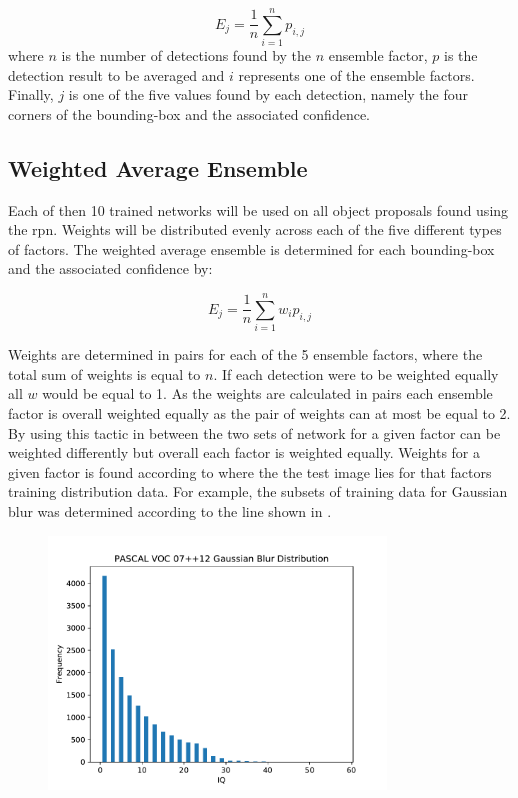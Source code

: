 \begin{equation}
  E_{j} = \frac{1}{n} \sum_{i=1}^{n} p_{i,j} 
\end{equation}
where $n$ is the number of detections found by the $n$ ensemble factor, $p$ is the detection result to be averaged and $i$ represents one of the ensemble factors. Finally, $j$ is one of the five values found by each detection, namely the four corners of the bounding-box and the associated confidence.


\subsection{Weighted Average Ensemble}
Each of then 10 trained networks will be used on all object proposals found using the \gls{rpn}. Weights will be distributed evenly across each of the five different types of factors. The weighted average ensemble is determined for each bounding-box and the associated confidence by:

\begin{equation}
	E_{j} = \frac{1}{n} \sum_{i=1}^{n} w_ip_{i,j} 
\end{equation}

Weights are determined in pairs for each of the 5 ensemble factors, where the total sum of weights is equal to $n$. If each detection were to be weighted equally all $w$ would be equal to 1. As the weights are calculated in pairs each ensemble factor is overall weighted equally as the pair of weights can at most be equal to 2. By using this tactic in between the two sets of network for a given factor can be weighted differently but overall each factor is weighted equally.
Weights for a given factor is found according to where the the test image lies for that factors training distribution data. For example, the subsets of training data for Gaussian blur was determined according to the line shown in . 


\begin{figure}[H]
  \centering
    \includegraphics[width=0.8\textwidth]{Figs/Implementation/GaussianBlurdist.pdf}
      \caption{}
    \label{fig:blur_dist}
\end{figure}

